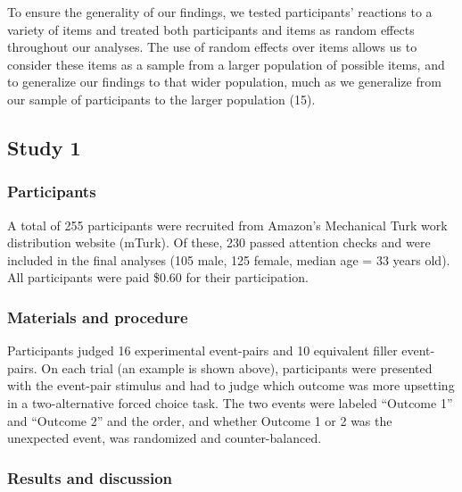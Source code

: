 \documentclass[9pt,twocolumn,twoside,]{pnas-new}
\begin{document}
{To ensure the generality of our findings, we tested participants'
reactions to a variety of items and treated both participants and items
as random effects throughout our analyses. The use of random effects
over items allows us to consider these items as a sample from a larger
population of possible items, and to generalize our findings to that
wider population, much as we generalize from our sample of participants
to the larger population (15).

\subsection*{Study 1}\label{study1}

\subsubsection*{Participants}\label{s1-participants}

A total of 255 participants were recruited from Amazon's Mechanical Turk
work distribution website (mTurk). Of these, 230 passed attention checks
and were included in the final analyses (105 male, 125 female, median
age = 33 years old). All participants were paid \$0.60 for their
participation.

\subsubsection*{Materials and procedure}\label{s1-materials-procedure}

Participants judged 16 experimental event-pairs and 10 equivalent filler
event-pairs. On each trial (an example is shown above), participants
were presented with the event-pair stimulus and had to judge which
outcome was more upsetting in a two-alternative forced choice task. The
two events were labeled ``Outcome 1'' and ``Outcome 2'' and the order,
and whether Outcome 1 or 2 was the unexpected event, was randomized and
counter-balanced.

\subsubsection*{Results and discussion}\label{s1-results}

}
\end{document}
